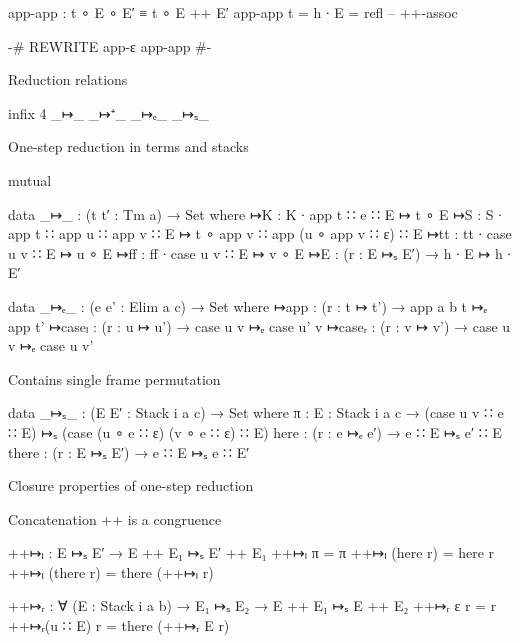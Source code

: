 
\begin{code}
app-app : t ∘ E ∘ E′ ≡ t ∘ E ++ E′
app-app {t = h ∙ E} = refl  -- ++-assoc

{-# REWRITE app-ε app-app #-}
\end{code}


Reduction relations

\begin{code}
infix 4 _↦_ _↦⁺_ _↦ₑ_ _↦ₛ_
\end{code}

One-step reduction in terms and stacks

\begin{code}
mutual

  data _↦_ : (t t′ : Tm a) → Set where
    ↦K   : K   ∙ app t ∷ e              ∷ E ↦ t  ∘ E
    ↦S   : S   ∙ app t ∷ app u ∷ app v  ∷ E ↦ t  ∘ app v ∷ app (u ∘ app v ∷ ε) ∷ E
    ↦tt  : tt  ∙ case u v               ∷ E ↦ u  ∘ E
    ↦ff  : ff  ∙ case u v               ∷ E ↦ v  ∘ E
    ↦E   : (r : E ↦ₛ E′) → h ∙ E ↦ h ∙ E′

  data _↦ₑ_ : (e e' : Elim a c) → Set where
    ↦app    : (r : t ↦ t')  → app {a} {b} t  ↦ₑ app t'
    ↦caseₗ  : (r : u ↦ u')  → case u v       ↦ₑ case u' v
    ↦caseᵣ  : (r : v ↦ v')  → case u v       ↦ₑ case u v'
\end{code}

  Contains single frame permutation

\begin{code}
  data _↦ₛ_ : (E E′ : Stack i a c) → Set where
    π      : {E : Stack i a c} → (case u v ∷ e ∷ E) ↦ₛ (case (u ∘ e ∷ ε) (v ∘ e ∷ ε) ∷ E)
    here   : (r : e ↦ₑ e′)     → e ∷ E              ↦ₛ e′ ∷ E
    there  : (r : E ↦ₛ E′)     → e ∷ E              ↦ₛ e  ∷ E′
\end{code}

Closure properties of one-step reduction

Concatenation ++ is a congruence

\begin{code}
++↦ₗ  :  E ↦ₛ E′
      →  E ++ E₁ ↦ₛ E′ ++ E₁
++↦ₗ π          = π
++↦ₗ (here  r)  = here r
++↦ₗ (there r)  = there (++↦ₗ r)

++↦ᵣ  :  ∀ (E : Stack i a b)
      →  E₁ ↦ₛ E₂
      →  E ++ E₁ ↦ₛ E ++ E₂
++↦ᵣ ε       r = r
++↦ᵣ(u ∷ E)  r = there (++↦ᵣ E r)
\end{code}

